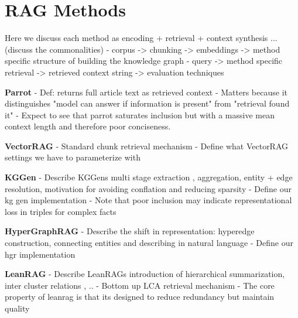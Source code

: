 \section{RAG Methods}

Here we discuss each method as encoding + retrieval + context synthesis
... (discuss the commonalities)
- corpus -> chunking -> embeddings -> method specific structure of building the knowledge graph
- query -> method specific retrieval -> retrieved context string -> evaluation techniques


\textbf{Parrot}
- Def: returns full article text as retrieved context
- Matters because it distinguishes "model can answer if information is present" from "retrieval found it"
- Expect to see that parrot saturates inclusion but with a massive mean context length and therefore poor conciseness.

\textbf{VectorRAG}
- Standard chunk retrieval mechanism
- Define what VectorRAG settings we have to parameterize with

\textbf{KGGen}
- Describe KGGens multi stage extraction , aggregation, entity + edge resolution, motivation for avoiding conflation and reducing sparsity
- Define our kg gen implementation
- Note that poor inclusion may indicate representational loss in triples for complex facts

\textbf{HyperGraphRAG}
- Describe the shift in representation: hyperedge construction, connecting entities and describing in natural language
- Define our hgr implementation

\textbf{LeanRAG}
- Describe LeanRAGs introduction of hierarchical summarization, inter cluster relations , ..
- Bottom up LCA retrieval mechanism
- The core property of leanrag is that its designed to reduce redundancy but maintain quality









